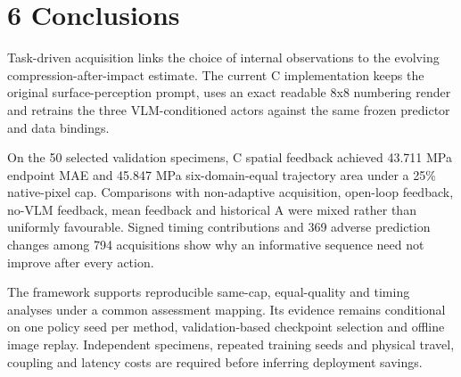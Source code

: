 \hypertarget{conclusions}{%
\section{6 Conclusions}\label{conclusions}}

Task-driven acquisition links the choice of internal observations to the evolving compression-after-impact estimate. The current C implementation keeps the original surface-perception prompt, uses an exact readable 8x8 numbering render and retrains the three VLM-conditioned actors against the same frozen predictor and data bindings.

On the 50 selected validation specimens, C spatial feedback achieved 43.711 MPa endpoint MAE and 45.847 MPa six-domain-equal trajectory area under a 25\% native-pixel cap. Comparisons with non-adaptive acquisition, open-loop feedback, no-VLM feedback, mean feedback and historical A were mixed rather than uniformly favourable. Signed timing contributions and 369 adverse prediction changes among 794 acquisitions show why an informative sequence need not improve after every action.

The framework supports reproducible same-cap, equal-quality and timing analyses under a common assessment mapping. Its evidence remains conditional on one policy seed per method, validation-based checkpoint selection and offline image replay. Independent specimens, repeated training seeds and physical travel, coupling and latency costs are required before inferring deployment savings.
